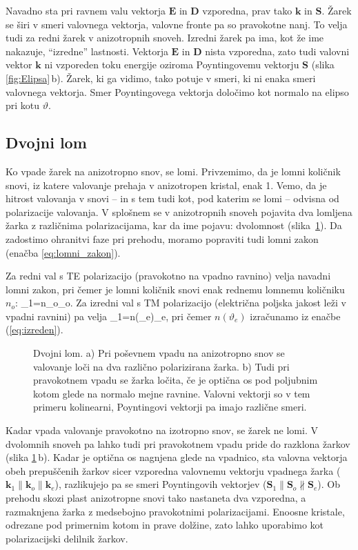 Navadno sta pri ravnem valu vektorja $\mathbf{E}$ in $\mathbf{D}$ vzporedna, 
prav tako $\mathbf{k}$ in $\mathbf{S}$. Žarek se širi v smeri valovnega vektorja, 
valovne fronte pa so pravokotne nanj. To velja tudi za redni žarek v anizotropnih
snoveh. Izredni žarek pa ima, kot že ime nakazuje, ``izredne'' lastnosti. Vektorja
$\mathbf{E}$ in $\mathbf{D}$ nista vzporedna, zato tudi valovni vektor $\mathbf{k}$ ni vzporeden
toku energije oziroma Poyntingovemu vektorju $\mathbf{S}$ (slika \ref{fig:Elipsa}\,b). 
Žarek, ki ga vidimo, tako potuje v smeri, ki ni enaka smeri valovnega vektorja. Smer
Poyntingovega vektorja določimo kot normalo na elipso pri kotu $\vartheta$. 

\subsection*{Dvojni lom}
Ko vpade žarek na anizotropno snov, se lomi. Privzemimo, da je lomni količnik snovi,
iz katere valovanje prehaja v anizotropen kristal, enak 1. Vemo, da je hitrost valovanja v 
snovi -- in s tem tudi kot, pod katerim se lomi -- odvisna od polarizacije valovanja. V splošnem
se v anizotropnih snoveh pojavita dva lomljena žarka z različnima polarizacijama, kar
da ime pojavu: dvolomnost (slika~\ref{fig:dvolomnost}). 
Da zadostimo ohranitvi faze
pri prehodu, moramo popraviti tudi lomni zakon (enačba \ref{eq:lomni_zakon}).

Za redni val s TE polarizacijo (pravokotno na vpadno ravnino) velja navadni lomni zakon, pri čemer
je lomni količnik snovi enak rednemu lomnemu količniku $n_o$:
\beq
\sin\vartheta_{1}=n_{o}\sin\vartheta_{o}.
\eeq
Za izredni val s TM polarizacijo (električna poljska jakost leži v vpadni ravnini) pa velja
\beq
\sin\vartheta_{1}=n(\vartheta_e)\sin\vartheta_{e},
\eeq
pri čemer $n(\vartheta_e)$ izračunamo iz enačbe (\ref{eq:izreden}).

\begin{figure}
\centering
\def\svgwidth{140truemm} 

\caption{Dvojni lom. a) Pri poševnem vpadu na anizotropno snov se
valovanje loči na dva različno polarizirana žarka. b) Tudi pri pravokotnem vpadu se žarka 
ločita, če je optična os pod poljubnim kotom glede na normalo mejne ravnine. Valovni vektorji
so v tem primeru kolinearni, Poyntingovi vektorji pa imajo različne smeri.}
\label{fig:dvolomnost}
\end{figure}

Kadar vpada valovanje pravokotno na izotropno snov, se žarek ne lomi. V 
dvolomnih snoveh pa lahko tudi pri pravokotnem vpadu pride do razklona žarkov (slika
\ref{fig:dvolomnost}\,b). Kadar je optična os nagnjena glede na vpadnico, sta valovna vektorja
obeh prepuščenih žarkov sicer vzporedna valovnemu vektorju vpadnega žarka ($\mathbf{k}_1 \parallel
\mathbf{k}_o \parallel \mathbf{k}_e$), razlikujejo pa se smeri Poyntingovih vektorjev
($\mathbf{S}_1 \parallel \mathbf{S}_o \nparallel \mathbf{S}_e$). Ob prehodu skozi 
plast anizotropne snovi tako nastaneta dva vzporedna, a razmaknjena žarka z medsebojno
pravokotnimi polarizacijami. Enoosne kristale, odrezane pod primernim kotom in prave dolžine,
zato lahko uporabimo kot polarizacijski delilnik žarkov.

